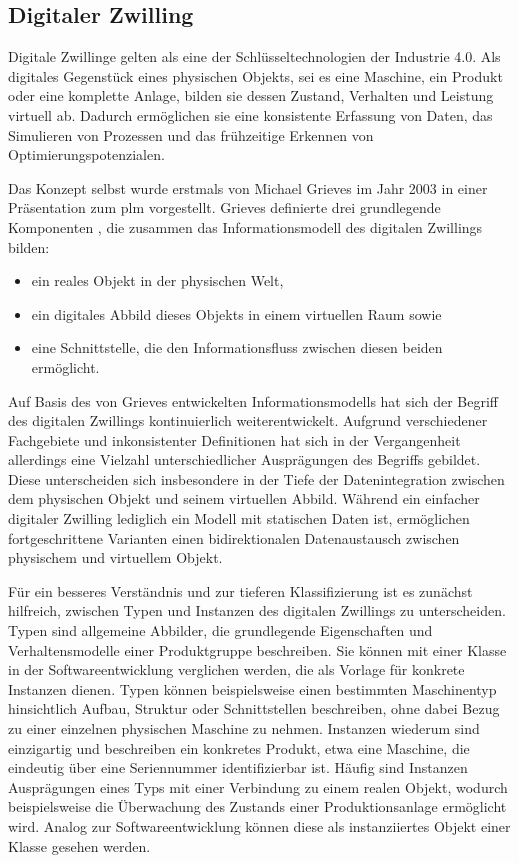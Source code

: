 \newpage
\subsection{Digitaler Zwilling}
\label{sec: DT}
Digitale Zwillinge gelten als eine der Schlüsseltechnologien der Industrie 4.0.
Als digitales Gegenstück eines physischen Objekts, sei es eine Maschine, ein Produkt oder eine komplette Anlage, bilden sie dessen Zustand, Verhalten und Leistung virtuell ab.
Dadurch ermöglichen sie eine konsistente Erfassung von Daten, das Simulieren von Prozessen und das frühzeitige Erkennen von Optimierungspotenzialen.

Das Konzept selbst wurde erstmals von Michael Grieves im Jahr 2003 in einer Präsentation zum \ac{plm} vorgestellt. 
Grieves definierte drei grundlegende Komponenten \cite{DTGrieves}, die zusammen das Informationsmodell des digitalen Zwillings bilden:
\begin{itemize}
    \item ein reales Objekt in der physischen Welt,
    \item ein digitales Abbild dieses Objekts in einem virtuellen Raum sowie
    \item eine Schnittstelle, die den Informationsfluss zwischen diesen beiden ermöglicht.
\end{itemize}

Auf Basis des von Grieves entwickelten Informationsmodells hat sich der Begriff des digitalen Zwillings kontinuierlich weiterentwickelt.
Aufgrund verschiedener Fachgebiete und inkonsistenter Definitionen hat sich in der Vergangenheit allerdings eine Vielzahl unterschiedlicher Ausprägungen des Begriffs gebildet.
Diese unterscheiden sich insbesondere in der Tiefe der Datenintegration zwischen dem physischen Objekt und seinem virtuellen Abbild.
Während ein einfacher digitaler Zwilling lediglich ein Modell mit statischen Daten ist, ermöglichen fortgeschrittene Varianten einen bidirektionalen Datenaustausch zwischen physischem und virtuellem Objekt. 

Für ein besseres Verständnis und zur tieferen Klassifizierung ist es zunächst hilfreich, zwischen Typen und Instanzen des digitalen Zwillings zu unterscheiden.
Typen sind allgemeine Abbilder, die grundlegende Eigenschaften und Verhaltensmodelle einer Produktgruppe beschreiben. 
Sie können mit einer Klasse in der Softwareentwicklung verglichen werden, die als Vorlage für konkrete Instanzen dienen.
Typen können beispielsweise einen bestimmten Maschinentyp hinsichtlich Aufbau, Struktur oder Schnittstellen beschreiben, ohne dabei Bezug zu einer einzelnen physischen Maschine zu nehmen.
Instanzen wiederum sind einzigartig und beschreiben ein konkretes Produkt, etwa eine Maschine, die eindeutig über eine Seriennummer identifizierbar ist.
Häufig sind Instanzen Ausprägungen eines Typs mit einer Verbindung zu einem realen Objekt, wodurch beispielsweise die Überwachung des Zustands einer Produktionsanlage ermöglicht wird.
Analog zur Softwareentwicklung können diese als instanziiertes Objekt einer Klasse gesehen werden. \cite{ZEISS}

